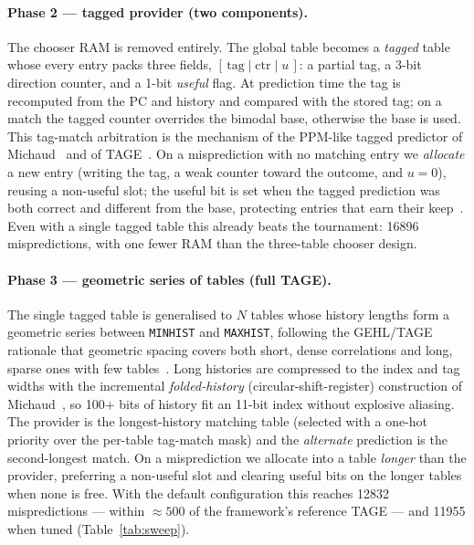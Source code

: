 \documentclass[11pt]{article}
\newcommand{\code}[1]{\texttt{\small #1}}
\begin{document}
\paragraph{Phase 2 --- tagged provider (two components).}
The chooser RAM is removed entirely. The global table becomes a \emph{tagged}
table whose every entry packs three fields, \([\,\text{tag}\mid\text{ctr}\mid
u\,]\): a partial tag, a 3-bit direction counter, and a 1-bit \emph{useful}
flag. At prediction time the tag is recomputed from the PC and history and
compared with the stored tag; on a match the tagged counter overrides the
bimodal base, otherwise the base is used. This tag-match arbitration is the
mechanism of the PPM-like tagged predictor of Michaud~\cite{michaud2005} and of
TAGE~\cite{seznec2006}. On a misprediction with no matching entry we
\emph{allocate} a new entry (writing the tag, a weak counter toward the outcome,
and \(u=0\)), reusing a non-useful slot; the useful bit is set when the tagged
prediction was both correct and different from the base, protecting entries that
earn their keep~\cite{seznec2006}. Even with a single tagged table this already
beats the tournament: \num{16896} mispredictions, with one fewer RAM than the
three-table chooser design.

\paragraph{Phase 3 --- geometric series of tables (full TAGE).}
The single tagged table is generalised to \(N\) tables whose history lengths
form a geometric series between \code{MINHIST} and \code{MAXHIST}, following the
GEHL/TAGE rationale that geometric spacing covers both short, dense correlations
and long, sparse ones with few tables~\cite{seznec2005,seznec2006}. Long
histories are compressed to the index and tag widths with the incremental
\emph{folded-history} (circular-shift-register) construction of
Michaud~\cite{michaud2005}, so 100+ bits of history fit an 11-bit index without
explosive aliasing. The provider is the longest-history matching table (selected
with a one-hot priority over the per-table tag-match mask) and the
\emph{alternate} prediction is the second-longest match. On a misprediction we
allocate into a table \emph{longer} than the provider, preferring a non-useful
slot and clearing useful bits on the longer tables when none is free. With the
default configuration this reaches \num{12832} mispredictions ---
within $\approx\!500$ of the framework's reference TAGE --- and \num{11955} when
tuned (Table~\ref{tab:sweep}).
\end{document}

